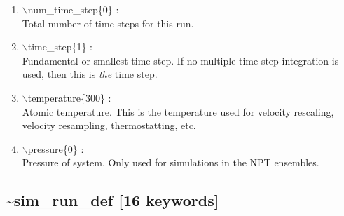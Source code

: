 \documentclass[12pt,titlepage]{article}
\begin{document}
\begin{enumerate}
 \vspace{0.15in} 
 \item  $\backslash$num\_time\_step\{0\} : \\
     Total number of time steps for this run.

 \vspace{0.15in} 
 \item   $\backslash$time\_step\{1\} : \\
     Fundamental or smallest time step.  If no multiple time step integration 
     is used, then this is {\it the} time step.


 \vspace{0.15in} 
 \item   $\backslash$temperature\{300\} : \\
     Atomic temperature.  This is the temperature used for velocity rescaling,
     velocity resampling, thermostatting, etc.


 \vspace{0.15in} 
 \item   $\backslash$pressure\{0\} : \\
     Pressure of system.  Only used for simulations in the NPT ensembles.
\end{enumerate}

\newpage
\subsection*{\bf \~{}sim\_run\_def [16 keywords]}
\end{document}
